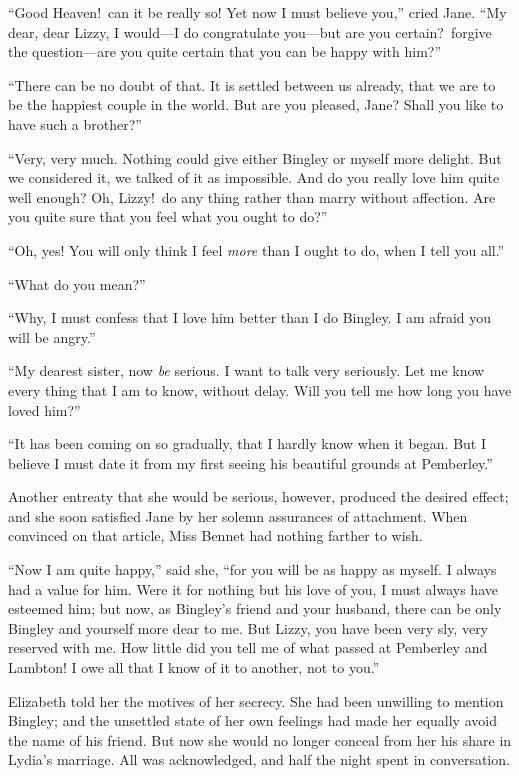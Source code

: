 \documentclass[12pt,english,oneside]{book}
\begin{document}
{}``Good Heaven!\ can it be really so! Yet now I must believe you,''
cried Jane. {}``My dear, dear Lizzy, I would\mbox{---}I do congratulate
you\mbox{---}but are you certain?\ forgive the question\mbox{---}are
you quite certain that you can be happy with him?''

{}``There can be no doubt of that. It is settled between us already,
that we are to be the happiest couple in the world. But are you pleased,
Jane? Shall you like to have such a brother?''

{}``Very, very much. Nothing could give either Bingley or myself
more delight. But we considered it, we talked of it as impossible.
And do you really love him quite well enough? Oh, Lizzy!\ do any
thing rather than marry without affection. Are you quite sure that
you feel what you ought to do?''

{}``Oh, yes! You will only think I feel \textit{more} than I ought
to do, when I tell you all.''

{}``What do you mean?''

{}``Why, I must confess that I love him better than I do Bingley.
I am afraid you will be angry.''

{}``My dearest sister, now \textit{be} serious. I want to talk very
seriously. Let me know every thing that I am to know, without delay.
Will you tell me how long you have loved him?''\


{}``It has been coming on so gradually, that I hardly know when it
began. But I believe I must date it from my first seeing his beautiful
grounds at Pemberley.''

Another entreaty that she would be serious, however, produced the
desired effect; and she soon satisfied Jane by her solemn assurances
of attachment. When convinced on that article, Miss Bennet had nothing
farther to wish.

{}``Now I am quite happy,'' said she, {}``for you will be as happy
as myself. I always had a value for him. Were it for nothing but his
love of you, I must always have esteemed him; but now, as Bingley's
friend and your husband, there can be only Bingley and yourself more
dear to me. But Lizzy, you have been very sly, very reserved with
me. How little did you tell me of what passed at Pemberley and Lambton!
I owe all that I know of it to another, not to you.''

Elizabeth told her the motives of her secrecy. She had been unwilling
to mention Bingley; and the unsettled state of her own feelings had
made her equally avoid the name of his friend. But now she would no
longer conceal from her his share in Lydia's marriage. All was acknowledged,
and half the night spent in conversation.
\end{document}

